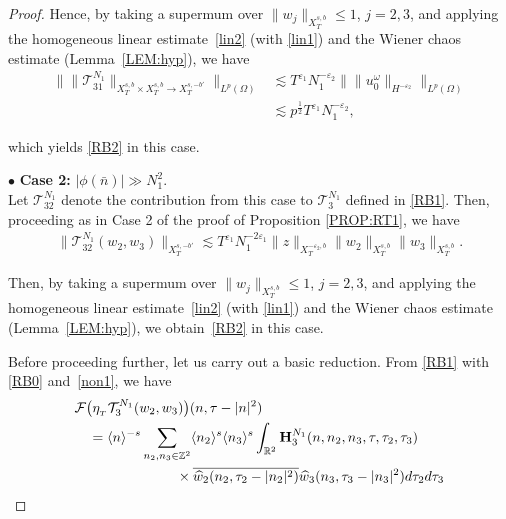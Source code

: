 \documentclass[%
11pt,  reqno]{amsart}
\newcommand{\1}{\hspace{0.2mm}\text{I}\hspace{0.2mm}}
\newcommand{\noi}{\noindent}
\newcommand{\Z}{\mathbb{Z}}
\newcommand{\R}{\mathbb{R}}
\newcommand{\F}{\mathcal{F}}
\newcommand{\eps}{\varepsilon}
\newcommand{\ft}{\widehat}
\newcommand{\cj}{\overline}
\renewcommand{\o}{\omega}
\renewcommand{\O}{\Omega}
\newcommand{\les}{\lesssim}
\newcommand{\jb}[1]
{\langle #1 \rangle}
\numberwithin{equation}{section}
\numberwithin{theorem}{section}
\newcommand{\Hb}{\mathbf{H}}
\newcommand{\TT}{\mathcal{T}}
\begin{document}
\begin{proof}
\noi
Hence, by 
taking a supermum over $\|w_j\|_{X^{s, b}_T}\le 1$, $j = 2, 3$, 
and applying  the homogeneous linear estimate~\eqref{lin2}
(with \eqref{lin1})
and the Wiener chaos estimate (Lemma~\ref{LEM:hyp}), 
 we have
\begin{align*}
\Big\| \| \TT_{31}^{N_1}
\|_{X^{s,b}_T\times X^{s,b}_T  \to X^{s,-b'}_T} 
\Big\|_{L^p (\O)}  
& \les 
T^{\eps_1} 
N_1^{-\eps_2}
\big\|\| u_0^\o\|_{H^{-\eps_2}}\big\|_{L^{p} (\O)}\\
&  \les p^\frac 12 
T^{\eps_1}N_1^{-\eps_2}, 
\end{align*}

\noi
which yields 
\eqref{RB2} in this case.



\medskip

\noi 
$\bullet$ {\bf Case 2:}
$|\phi(\bar n)| \gg  N_1^2$.
\\
\indent
Let $\TT^{N_1}_{32}$ denote the contribution
from this case 
to $\TT_{3}^{N_1}$ defined in \eqref{RB1}.
Then, 
proceeding as in Case 2 of the proof of Proposition \ref{PROP:RT1}, 
we have
\begin{align*}
\|\TT_{32}^{N_1}(w_2, w_3)\|_{X^{s, - b'}_T}
\les T^{\eps_1} N_1^{-2\eps_1}
 \| z\|_{X^{-\eps_2, b }_T}
\|w_2\|_{X^{s, b}_T}
\|w_3\|_{X^{s, b}_T}.
\end{align*}


\noi
Then,  by 
taking a supermum over $\|w_j\|_{X^{s, b}_T}\le 1$, $j = 2, 3$, 
and applying  the homogeneous linear estimate~\eqref{lin2}
(with \eqref{lin1})
and the Wiener chaos estimate (Lemma~\ref{LEM:hyp}), 
 we obtain~\eqref{RB2} in this case.







\medskip

Before proceeding further, let us carry out 
a basic reduction.
From \eqref{RB1} with \eqref{RB0} and~\eqref{non1}, 
we have 
\begin{align*}
& \F \big(\eta_{_T}  
 \TT_{3}^{N_1}(w_2, w_3) \big)
 (n,\tau - |n|^2) \\ 
& \quad = \jb{n}^{-s}
 \sum_{n_2,n_3 \in \Z^2}
 \jb{n_2}^s  \jb{n_3}^s \int_{\R^2}
\Hb_3^{N_1} (n,n_2,n_3,\tau,\tau_2,\tau_3)  \\
& \hphantom{XXXXXXXX} \times
\cj{\ft w_2(n_2, \tau_2 - |n_2|^2)}  \ft w_3(n_3, \tau_3  - |n_3|^2) d\tau_2 d\tau_3\\
\end{align*}


\end{proof}
\end{document}
